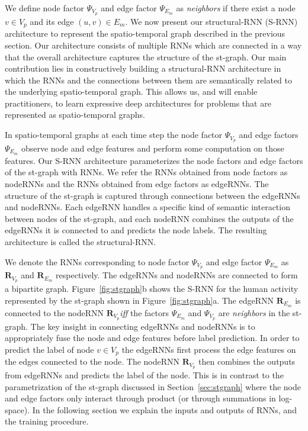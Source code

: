 \documentclass[10pt,twocolumn,letterpaper]{article}
\newcommand{\ve}[1]{\mathbf{#1}}
\begin{document}
We define node factor $\Psi_{V_p}$ and edge factor $\Psi_{E_m}$ as \textit{neighbors} if there exist a node $v \in V_p$ and its edge $(u,v) \in {E}_m$. 
We now present our structural-RNN (S-RNN) architecture to represent the spatio-temporal graph described in the previous section. Our architecture consists of multiple RNNs which are connected in a way that the overall architecture captures the structure of the st-graph. Our main contribution lies in constructively building a structural-RNN architecture in which the RNNs and the connections between them are semantically related to the underlying spatio-temporal graph. This allows us, and will enable practitioners, to learn expressive deep architectures for problems that are represented as spatio-temporal graphs. 

In spatio-temporal graphs at each time step the node factor $\Psi_{V_p}$ and edge factors $\Psi_{E_m}$ observe node and edge features and perform some computation on those features. Our S-RNN architecture parameterizes the node factors and edge factors of the st-graph with RNNs. We refer the RNNs obtained from node factors as nodeRNNs and the RNNs obtained from edge factors as edgeRNNs.  The structure of the st-graph is captured through connections between the edgeRNNs and nodeRNNs. Each edgeRNN handles a specific kind of semantic interaction between nodes of the st-graph, and each nodeRNN combines the outputs of the edgeRNNs it is connected to and predicts the node labels.  The resulting architecture is called the structural-RNN.  


We denote the RNNs corresponding to node factor $\Psi_{V_p}$ and edge factor $\Psi_{E_m}$ as  $\ve{R}_{V_p}$ and $\ve{R}_{E_m}$ respectively. The edgeRNNs and nodeRNNs are connected to form a bipartite graph. Figure~\ref{fig:stgraph}b shows the S-RNN for the human activity represented by the st-graph shown in  Figure~\ref{fig:stgraph}a. The edgeRNN $\ve{R}_{E_m}$ is connected to the nodeRNN $\ve{R}_{V_p}$\textit{iff} the factors $\Psi_{E_m}$  and $\Psi_{V_p}$ are \textit{neighbors} in the st-graph. The key insight in connecting edgeRNNs and nodeRNNs is to appropriately fuse the node and edge features before label prediction. In order to predict the label of node $v \in V_p$ the edgeRNNs first process the edge features on the edges connected to the node. The nodeRNN $\ve{R}_{V_p}$ then combines the outputs from edgeRNNs and predicts the label of the node. This is in contrast to the parametrization of the st-graph discussed in Section~\ref{sec:stgraph} where the node and edge factors only interact through product (or through summations in log-space). In the following section we explain the inputs and outputs of RNNs, and the training procedure.
\end{document}
